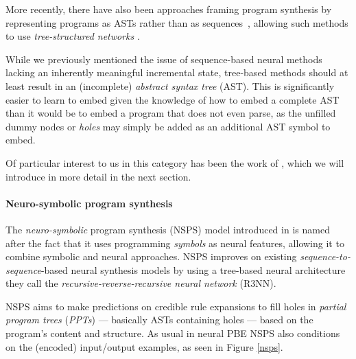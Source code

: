 \documentclass{article}
\begin{document}
More recently, there have also been approaches framing program synthesis by representing programs as ASTs rather than as sequences~\citep{polosukhin2018neural},
allowing such methods to use \emph{tree-structured networks}%
.

While
we previously
mentioned the issue of
sequence-based neural methods lacking an inherently meaningful incremental state,
tree-based methods should at least result in an (incomplete) \emph{abstract syntax tree} (AST).
This is significantly easier to learn to embed given the knowledge of how to embed a complete AST than it would be to embed a program that does not even parse,
as the unfilled dummy nodes or \emph{holes} may simply be added as an additional AST symbol to embed.

Of particular interest to us in this category has been the work of \citet{nsps},
which we will introduce in more detail in the next section.

\paragraph{Neuro-symbolic program synthesis} \label{sec:nsps}

The \emph{neuro-symbolic} program synthesis (NSPS) model introduced in \citet{nsps} is named after the fact that it uses programming \emph{symbols} as neural features,
allowing it to combine symbolic and neural approaches.
NSPS improves on existing \emph{sequence-to-sequence}-based neural synthesis models by using a tree-based neural architecture they call the \emph{recursive-reverse-recursive neural network} (R3NN).

NSPS aims to make predictions on credible rule expansions to fill holes
in \emph{partial program trees} (\emph{PPTs}) --- basically ASTs containing holes --- based on the program's content and structure.
As usual in neural PBE NSPS also conditions on the (encoded) input/output examples, as seen in Figure \ref{nsps}.
\end{document}
